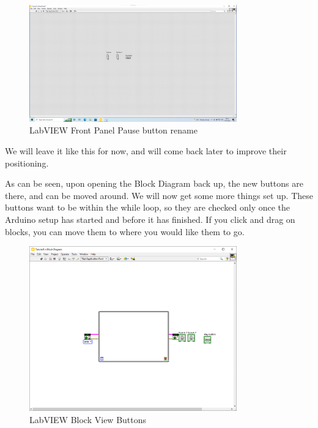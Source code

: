\documentclass[a4paper,11pt]{report}
\begin{document}
\begin{figure}[H]
\centering
\includegraphics[width=0.8\textwidth]{screenshots/labview14}
\caption{LabVIEW Front Panel Pause button rename}
\end{figure}

We will leave it like this for now, and will come back later to improve their positioning.

As can be seen, upon opening the Block Diagram back up, the new buttons are there, and can be moved around. We will now get some more things set up. These buttons want to be within the while loop, so they are checked only once the Arduino setup has started and before it has finished. If you click and drag on blocks, you can move them to where you would like them to go.

\begin{figure}[H]
\centering
\includegraphics[width=0.8\textwidth]{screenshots/labview15}
\caption{LabVIEW Block View Buttons}
\end{figure}
\end{document}

